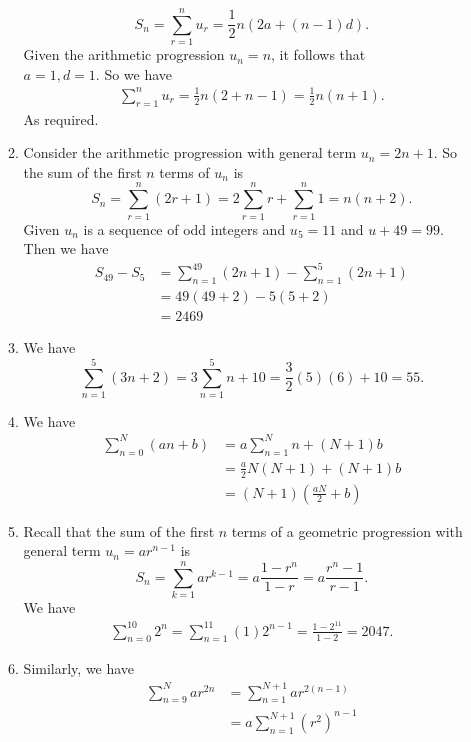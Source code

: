\documentclass[12pt,oneside]{book}
\begin{document}
\begin{enumerate}
\begin{enumerate}
\[                S_n = \sum_{r=1}^{n} u_r = \frac{1}{2} n (2a + (n-1) d)
            .\] 
            Given the arithmetic progression $u_n = n$, it follows that \\ $a = 1, d = 1$. So we have \begin{align*}
                \sum_{r=1}^{n} u_r = \frac{1}{2} n (2 + n - 1) = \frac{1}{2} n (n + 1). 
            \end{align*}
            As required.
            \item Consider the arithmetic progression with general term $u_n = 2n + 1$. So the sum of the first $n$ terms of $u_n$ is \[
                S_n = \sum_{r=1}^{n} (2r + 1) = 2 \sum_{r=1}^{n} r + \sum_{r=1}^{n} 1 = n(n + 2)  
            .\]  Given $u_n$ is a sequence of odd integers and $u_5 = 11$ and $u+49 = 99$. Then we have \begin{align*}
                S_{49} - S_{5} &= \sum_{n=1}^{49} (2n + 1) - \sum_{n=1}^{5} (2n+1) \\ 
                &= 49(49 + 2) - 5(5 + 2) \\
                &= 2469
            \end{align*}
            \item We have \[
                \sum_{n=1}^{5} (3n + 2) = 3 \sum_{n=1}^{5} n + 10 = \frac{3}{2} (5)(6) + 10 = 55
            .\] 
            \item We have \begin{align*}
                \sum_{n=0}^{N} (an+b) &= a \sum_{n=1}^{N} n + (N+1)b \\
                &= \frac{a}{2} N (N + 1) + (N+1)b \\
                &= (N+1) \left( \frac{aN}{2} + b \right) 
            \end{align*}
            \item  Recall that the sum of the first $n$ terms of a geometric progression with general term $u_n = ar^{n -1}$ is \[
                S_n = \sum_{k=1}^{n} ar^{k-1} = a\frac{1-r^{n}}{1-r} = a \frac{r^{n} - 1}{r - 1}
            .\] We have \begin{align*}
                \sum_{n=0}^{10} 2^n = \sum_{n=1}^{11} (1) 2^{n - 1} = \frac{1-2^{11}}{1-2} = 2047.
            \end{align*}
            \item Similarly, we have \begin{align*}
                \sum_{n=9}^{N} ar^{2n} &=  \sum_{n=1}^{N+1} ar^{2(n-1)} \\
                &= a \sum_{n=1}^{N+1} (r^2)^{n-1} \\

\end{align*}
\end{enumerate}
\end{enumerate}
\end{document}
